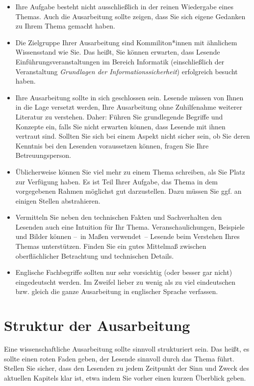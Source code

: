 \documentclass[lang=english]{secseminar}
\begin{document}
\begin{itemize}
\item Ihre Aufgabe besteht nicht ausschließlich in der reinen Wiedergabe eines Themas. Auch die
  Ausarbeitung sollte zeigen, dass Sie sich eigene Gedanken zu Ihrem Thema gemacht haben.
\item Die Zielgruppe Ihrer Ausarbeitung sind Kommiliton*innen mit ähnlichem Wissensstand wie Sie. Das
  heißt, Sie können erwarten, dass Lesende Einführungsveranstaltungen im Bereich Informatik
  (einschließlich der Veranstaltung \emph{Grundlagen der Informationssicherheit}) erfolgreich
  besucht haben.
\item Ihre Ausarbeitung sollte in sich geschlossen sein.  Lesende müssen von Ihnen in die Lage
  versetzt werden, Ihre Ausarbeitung ohne Zuhilfenahme weiterer Literatur zu verstehen. Daher:
  Führen Sie grundlegende Begriffe und Konzepte ein, falls Sie nicht erwarten können, dass Lesende
  mit ihnen vertraut sind. Sollten Sie sich bei einem Aspekt nicht sicher sein, ob Sie deren Kenntnis
  bei den Lesenden voraussetzen können, fragen Sie Ihre Betreuungsperson.
\item Üblicherweise können Sie viel mehr zu einem Thema schreiben, als Sie Platz zur Verfügung
  haben. Es ist Teil Ihrer Aufgabe, das Thema in dem vorgegebenen Rahmen möglichst gut
  darzustellen. Dazu müssen Sie ggf. an einigen Stellen abstrahieren.
\item Vermitteln Sie neben den technischen Fakten und Sachverhalten den Lesenden auch eine Intuition
  für Ihr Thema. Veranschaulichungen, Beispiele und Bilder können --~in Maßen verwendet~-- Lesende
  beim Verstehen Ihres Themas unterstützen.  Finden Sie ein gutes Mittelmaß zwischen oberflächlicher
  Betrachtung und technischen Details.
\item Englische Fachbegriffe sollten nur sehr vorsichtig (oder besser gar nicht) eingedeutscht
  werden. Im Zweifel lieber zu wenig als zu viel eindeutschen bzw. gleich die ganze Ausarbeitung in
  englischer Sprache verfassen.
\end{itemize}

\section{Struktur der Ausarbeitung}
Eine wissenschaftliche Ausarbeitung sollte sinnvoll strukturiert sein. Das heißt, es sollte einen
roten Faden geben, der Lesende sinnvoll durch das Thema führt. Stellen Sie sicher, dass den Lesenden
zu jedem Zeitpunkt der Sinn und Zweck des aktuellen Kapitels klar ist, etwa indem Sie vorher einen
kurzen Überblick geben.
\end{document}
